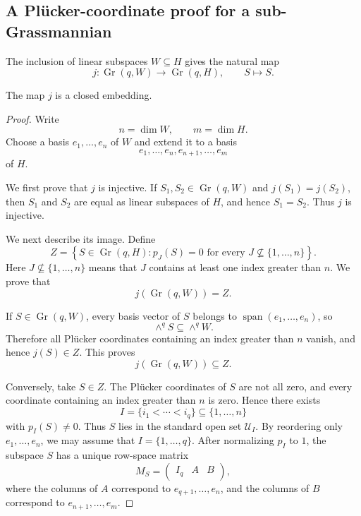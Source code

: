 \documentclass{siamonline250211}
\newcommand{\Gr}{\operatorname{Gr}}
\newcommand{\Span}{\operatorname{span}}
\newcommand{\cU}{\mathcal U}
\begin{document}
\subsection{A Pl\texorpdfstring{\"u}{u}cker-coordinate proof for a sub-Grassmannian}

The inclusion of linear subspaces $W\subseteq H$ gives the natural map
\begin{equation}\label{eq:j}
  j:\Gr(q,W)\longrightarrow\Gr(q,H),
  \qquad S\longmapsto S.
\end{equation}

\begin{lemma}
\label{lem:subgrassmannian-closed}
The map $j$ is a closed embedding.
\end{lemma}

\begin{proof}
Write
\[
  n=\dim W,\qquad m=\dim H.
\]
Choose a basis $e_1,\ldots,e_n$ of $W$ and extend it to a basis
\[
  e_1,\ldots,e_n,e_{n+1},\ldots,e_m
\]
of $H$.

We first prove that $j$ is injective. If $S_1,S_2\in\Gr(q,W)$ and
$j(S_1)=j(S_2)$, then $S_1$ and $S_2$ are equal as linear subspaces of $H$,
and hence $S_1=S_2$. Thus $j$ is injective.

We next describe its image. Define
\begin{equation}\label{eq:Z-subgrassmannian}
  Z=\left\{
  S\in\Gr(q,H):
  p_J(S)=0\text{ for every }J\nsubseteq\{1,\ldots,n\}
  \right\}.
\end{equation}
Here $J\nsubseteq\{1,\ldots,n\}$ means that $J$ contains at least one index
greater than $n$. We prove that
\begin{equation}\label{eq:image-j-Z}
  j(\Gr(q,W))=Z.
\end{equation}

If $S\in\Gr(q,W)$, every basis vector of $S$ belongs to
$\Span(e_1,\ldots,e_n)$, so
\[
  \wedge^qS\subseteq\wedge^qW.
\]
Therefore all Pl\"ucker coordinates containing an index greater than $n$ vanish,
and hence $j(S)\in Z$. This proves
\[
  j(\Gr(q,W))\subseteq Z.
\]

Conversely, take $S\in Z$. The Pl\"ucker coordinates of $S$ are not all zero,
and every coordinate containing an index greater than $n$ is zero. Hence there
exists
\[
  I=\{i_1<\cdots<i_q\}\subseteq\{1,\ldots,n\}
\]
with $p_I(S)\neq0$. Thus $S$ lies in the standard open set $\cU_I$. By
reordering only $e_1,\ldots,e_n$, we may assume that
$I=\{1,\ldots,q\}$. After normalizing $p_I$ to $1$, the subspace $S$ has a
unique row-space matrix
\begin{equation}\label{eq:subgrassmannian-chart-matrix}
  M_S=
  \begin{pmatrix}
    I_q&A&B
  \end{pmatrix},
\end{equation}
where the columns of $A$ correspond to $e_{q+1},\ldots,e_n$, and the columns of
$B$ correspond to $e_{n+1},\ldots,e_m$.


\end{proof}
\end{document}

